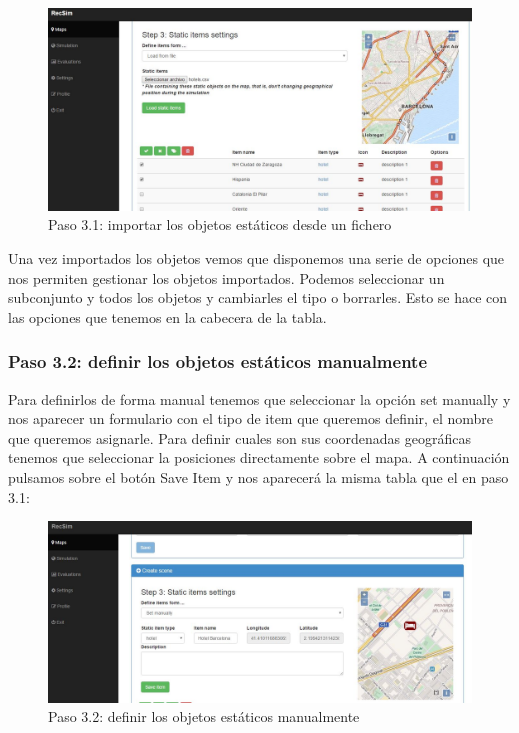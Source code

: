 \begin{figure}[H]
	\centering\includegraphics[scale=0.35]{imagenes/capitulo9/crear-escena-3.JPG}
	\caption{Paso 3.1: importar los objetos estáticos desde un fichero}
	\label{img:paso3-1}
\end{figure}

Una vez importados los objetos vemos que disponemos una serie de opciones que nos permiten gestionar los objetos importados. Podemos seleccionar un subconjunto y todos los objetos y cambiarles el tipo o borrarles. Esto se hace con las opciones que tenemos en la cabecera de la tabla.

\subsubsection{Paso 3.2: definir los objetos estáticos manualmente}

Para definirlos de forma manual tenemos que seleccionar la opción set manually y nos aparecer un formulario con el tipo de item que queremos definir, el nombre que queremos asignarle. Para definir cuales son sus coordenadas geográficas tenemos que seleccionar la posiciones directamente sobre el mapa. A continuación pulsamos sobre el botón Save Item y nos aparecerá la misma tabla que el en paso 3.1:

\begin{figure}[H]
	\centering\includegraphics[scale=0.35]{imagenes/capitulo9/crear-escena-4.JPG}
	\caption{Paso 3.2:  definir los objetos estáticos manualmente}
	\label{img:paso3-2}
\end{figure}

